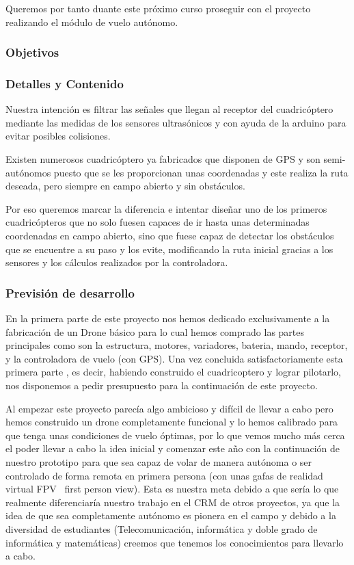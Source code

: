 \documentclass[12pt,twoside]{report}
\begin{document}
Queremos por tanto duante este próximo curso proseguir con el proyecto realizando el módulo de vuelo autónomo.

\subsubsection{Objetivos}

\subsubsection{Detalles y Contenido}
Nuestra intención es filtrar las señales que llegan al receptor del cuadricóptero mediante las medidas de los sensores ultrasónicos y con ayuda de la arduino para evitar posibles colisiones.

Existen numerosos cuadricóptero ya fabricados que disponen de GPS y son semi-autónomos puesto que se les proporcionan unas coordenadas y este realiza la ruta deseada, pero siempre en campo abierto y sin obstáculos.

Por eso queremos marcar la diferencia e intentar diseñar uno de los primeros cuadricópteros que no solo fuesen capaces de ir hasta unas determinadas coordenadas en campo abierto, sino que fuese capaz de detectar los obstáculos que se encuentre a su paso y los evite, modificando la ruta inicial gracias a los sensores y los cálculos realizados por la controladora.


\subsubsection{Previsión de desarrollo}
En la primera parte de este proyecto nos hemos dedicado exclusivamente a la fabricación de un Drone básico para lo cual hemos comprado las partes principales como son la estructura, motores, variadores, bateria, mando, receptor, y la controladora de vuelo (con GPS). Una vez concluida satisfactoriamente esta primera parte , es decir, habiendo construido el cuadricoptero y lograr pilotarlo, nos disponemos a pedir presupuesto para la continuación de este proyecto.

Al empezar este proyecto parecía algo ambicioso y difícil de llevar a cabo pero hemos construido un drone completamente funcional y lo hemos calibrado para que tenga unas condiciones de vuelo óptimas, por lo que vemos mucho más cerca el poder llevar a cabo la idea inicial y comenzar este año con la continuación de nuestro prototipo para que sea capaz de volar de manera autónoma o ser controlado de forma remota en primera persona (con unas gafas de realidad virtual FPV  first person view). Esta es nuestra meta debido a que sería lo que realmente diferenciaría nuestro trabajo en el CRM de otros proyectos, ya que la idea de que sea completamente autónomo es pionera en el campo y debido a la diversidad de estudiantes (Telecomunicación, informática y doble grado de informática y matemáticas) creemos que tenemos los conocimientos para llevarlo a cabo.
\end{document}
